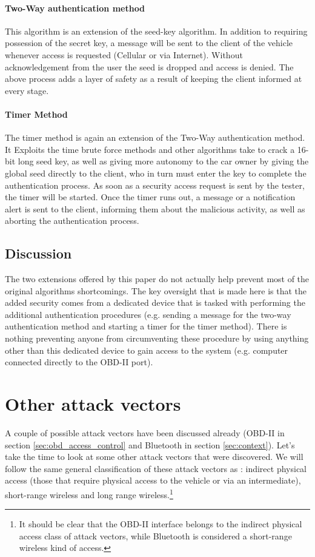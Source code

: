 \paragraph{Two-Way authentication method}
This algorithm is an extension of the seed-key algorithm. In addition to requiring possession of the secret key, a message will be sent to the client of the vehicle whenever access is requested (Cellular or via Internet). Without acknowledgement from the user the seed is dropped and access is denied. The above process adds a layer of safety as a result of keeping the client informed at every stage.

\paragraph{Timer Method}  
The timer method is again an extension of the Two-Way authentication method. It Exploits the time brute force methods and other algorithms take to crack a 16-bit long seed key, as well as giving more autonomy to the car owner by giving the global seed directly to the client, who in turn must enter the key to complete the authentication process. As soon as a security access request is sent by the tester, the timer will be started. Once the timer runs out, a message or a notification alert is sent to the client, informing them about the malicious activity, as well as aborting the authentication process. 

\subsection{Discussion} 
The two extensions offered by this paper do not actually help prevent most of the original algorithms shortcomings. The key oversight that is made here is that the added security comes from a dedicated device that is tasked with performing the additional authentication procedures (e.g. sending a message for the two-way authentication method and starting a timer for the timer method). There is nothing preventing anyone from circumventing these procedure by using anything other than this dedicated device to gain access to the system (e.g. computer connected directly to the OBD-II port). 

\section{Other attack vectors}
\label{sec:other_attack_vectors}

A couple of possible attack vectors have been discussed already (OBD-II in section \ref{sec:obd_access_control} and Bluetooth in section \ref{sec:context}). Let's take the time to look at some other attack vectors that were discovered. We will follow the same general classification of these attack vectors as \cite{Kosher}: indirect physical access (those that require physical access to the vehicle or via an intermediate), short-range wireless and long range wireless.\footnote{It should be clear that the OBD-II interface belongs to the indirect physical access class of attack vectors, while Bluetooth is considered a short-range wireless kind of access.}

